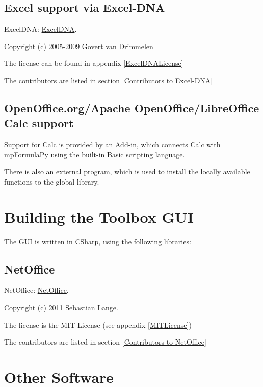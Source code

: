 \subsection{Excel support via Excel-DNA}
ExcelDNA: \href{http://exceldna.codeplex.com/}{ExcelDNA}.

Copyright (c) 2005-2009 Govert van Drimmelen

The license can be found in appendix \ref{ExcelDNALicense}

The contributors are listed in section \ref{Contributors to Excel-DNA}




\subsection{OpenOffice.org/Apache OpenOffice/LibreOffice Calc support}

Support for Calc is provided by an Add-in, which connects Calc with mpFormulaPy using the built-in Basic scripting language.

There is also an external program, which is used to install the locally available functions to the global library.




\section{Building the Toolbox GUI}
The GUI is written in CSharp, using the following libraries:



\subsection{NetOffice}
NetOffice: \href{http://netoffice.codeplex.com/}{NetOffice}. 

Copyright (c) 2011 Sebastian Lange. 

The license is the MIT License (see appendix \ref{MITLicense})

The contributors are listed in section \ref{Contributors to NetOffice}







\newpage
\section{Other Software}



